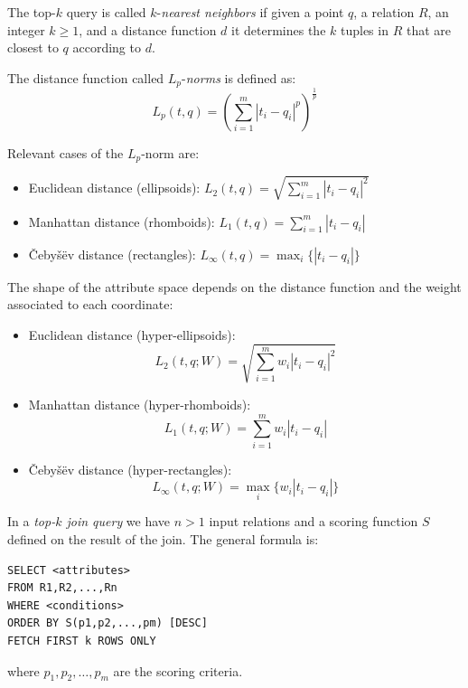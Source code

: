 \documentclass[12pt, a4paper]{report}
\begin{document}
    \begin{definition}
        The top-$k$ query is called $k$-\emph{nearest neighbors} if given a point $q$, a relation $R$, an integer $k \geq 1$, and a distance function $d$ it determines the $k$ tuples 
        in $R$ that are closest to $q$ according to $d$. 

        The distance function called $L_p$-\emph{norms} is defined as:
        \[L_p(t,q)=\left(\sum_{i=1}^{m}{\left\lvert t_i-q_i \right\rvert^{p}}\right)^{\frac{1}{p}}\]
    \end{definition}
    Relevant cases of the $L_p$-norm are: 
    \begin{itemize}
        \item Euclidean distance (ellipsoids): $L_2(t,q)=\sqrt{\sum_{i=1}^{m}{\left\lvert t_i-q_i \right\rvert^{2}}}$
        \item Manhattan distance (rhomboids): $L_1(t,q)=\sum_{i=1}^{m}{\left\lvert t_i-q_i \right\rvert}$
        \item Čebyšëv distance (rectangles): $L_{\infty}(t,q)=\max_{i}\{\left\lvert t_i-q_i\right\rvert\}$
    \end{itemize}
    The shape of the attribute space depends on the distance function and the weight associated to each coordinate: 
    \begin{itemize}
        \item Euclidean distance (hyper-ellipsoids):
            \[L_2(t,q;W)=\sqrt{\sum_{i=1}^{m}{w_i\left\lvert t_i-q_i \right\rvert^{2}}}\]
        \item Manhattan distance (hyper-rhomboids): 
            \[L_1(t,q;W)=\sum_{i=1}^{m}{w_i\left\lvert t_i-q_i \right\rvert}\]
        \item Čebyšëv distance (hyper-rectangles): 
            \[L_{\infty}(t,q;W)=\max_{i}\{w_i \left\lvert t_i-q_i\right\rvert\}\]
    \end{itemize}
    \begin{definition}
        In a \emph{top-$k$ join query} we have $n > 1$ input relations and a scoring function $S$ defined on the result of the join. The general formula is: 
        \begin{lstlisting}[style=SQL]
SELECT <attributes>
FROM R1,R2,...,Rn
WHERE <conditions>
ORDER BY S(p1,p2,...,pm) [DESC]
FETCH FIRST k ROWS ONLY             
        \end{lstlisting}
        where $p_1,p_2,\dots,p_m$ are the scoring criteria. 
    \end{definition}
\end{document}
